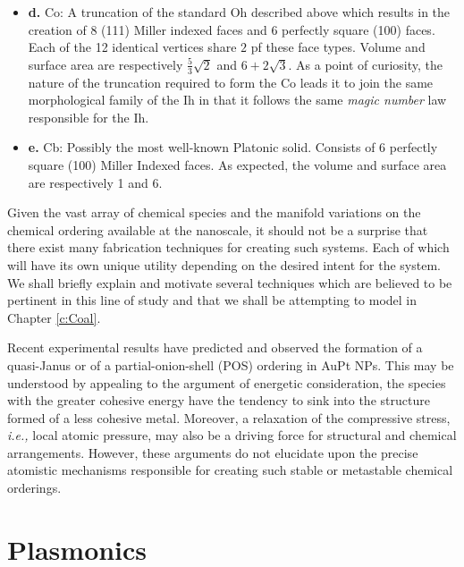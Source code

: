 \begin{itemize}
    \item \textbf{d.} Co: A truncation of the standard Oh described above which results in the creation of 8 (111) Miller indexed faces and 6 perfectly square (100) faces.  Each of the 12 identical vertices share $2$ pf these face types. Volume and surface area are respectively $\frac{5}{3}\sqrt{2}$ and $6+2\sqrt{3}$. As a point of curiosity, the nature of the truncation required to form the Co leads it to join the same morphological family of the Ih in that it follows the same \textit{magic number} law responsible for the Ih.
    \item \textbf{e.} Cb: Possibly the most well-known Platonic solid. Consists of 6 perfectly square (100) Miller Indexed faces. As expected, the volume and surface area are respectively 1 and 6.
    \label{list:nps}
\end{itemize}

Given the vast array of chemical species and the manifold variations on the chemical ordering available at the nanoscale, it should not be a surprise that there exist many fabrication techniques for creating such systems. Each of which will have its own unique utility depending on the desired intent for the system. We shall briefly explain and motivate several techniques which are believed to be pertinent in this line of study and that we shall be attempting to model in Chapter \ref{c:Coal}.

Recent experimental results \cite{Namsoon2021,Kummel2013,Deng2010,Erhart2018} have predicted and observed the formation of a quasi-Janus or of a partial-onion-shell (POS) ordering in AuPt NPs. This may be understood by appealing to the argument of energetic consideration, the species with the greater cohesive energy have the tendency to sink into the structure formed of a less cohesive metal. Moreover, a relaxation of the compressive stress, \textit{i.e.,} local atomic pressure\cite{Taran2020,Bochicchio2013}, may also be a driving force for structural and chemical arrangements. However, these arguments do not elucidate upon the precise atomistic mechanisms responsible for creating such stable or metastable chemical orderings.

%
\section{Plasmonics}
\label{sec:plasmons}
